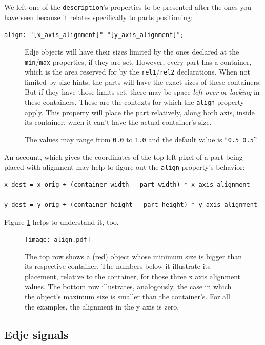 \documentclass[a4paper]{profusion}
\begin{document}
We left one of the \texttt{description}'s properties to be presented
after the ones you have seen because it relates specifically to parts
positioning:

\begin{description}
\item[\texttt{align: "[x\_axis\_alignment]" "[y\_axis\_alignment]";}]
  Edje objects will have their sizes limited by the ones declared at
  the \texttt{min}/\texttt{max} properties, if they are set. However,
  every part has a container, which is the area reserved for by the
  \texttt{rel1}/\texttt{rel2} declarations. When not limited by size
  hints, the parts will have the exact sizes of these containers. But
  if they have those limits set, there may be space \emph{left over}
  or \emph{lacking} in these containers. These are the contexts for
  which the \texttt{align} property apply. This property will place
  the part relatively, along both axis, inside its container, when it
  can't have the actual container's size.

  The values may range from \texttt{0.0} to \texttt{1.0} and the
    default value is ``\texttt{0.5 0.5}''.
\end{description}

An account, which gives the coordinates of the top left pixel of a
part being placed with alignment may help to figure out the
\texttt{align} property's behavior:

\begin{verbatim}
x_dest = x_orig + (container_width - part_width) * x_axis_alignment

y_dest = y_orig + (container_height - part_height) * y_axis_alignment
\end{verbatim}

Figure \ref{fig:align} helps to understand it, too.

\begin{figure}
  \centering
  \texttt{[image: align.pdf]}
  \caption{The top row shows a (red) object whose minimum size is
    bigger than its respective container. The numbers below it
    illustrate its placement, relative to the container, for those
    three x axis alignment values. The bottom row illustrates,
    analogously, the case in which the object's maximum size is
    smaller than the container's. For all the examples, the alignment
    in the y axis is zero.}
  \label{fig:align}
\end{figure}

\subsection{Edje signals}
\label{sec:signals}
\end{document}
